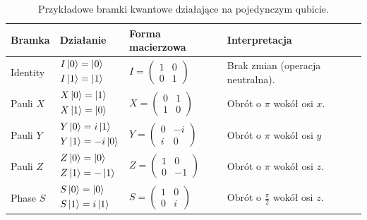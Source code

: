 \begin{table}[H]
\caption{Przykładowe bramki kwantowe działające na pojedynczym qubicie.}
\label{tab:bramki_kwantowe}
\resizebox{\textwidth}{!}
{
    \centering
    \begin{tabular}{l l l l}
        \hline
        \textbf{Bramka} & \textbf{Działanie} & \textbf{Forma macierzowa} & \textbf{Interpretacja} \\
        \hline
        Identity & $\begin{aligned} I\ket{0} &= \ket{0} \\ I\ket{1} &= \ket{1} \end{aligned}$ & $I = \begin{pmatrix} 1 & 0 \\ 0 & 1 \end{pmatrix}$ & Brak zmian (operacja neutralna). \\
        \hline
        Pauli $X$ & $\begin{aligned} X\ket{0} &= \ket{1} \\ X\ket{1} &= \ket{0} \end{aligned}$ & $X = \begin{pmatrix} 0 & 1 \\ 1 & 0 \end{pmatrix}$ & Obrót o $\pi$ wokół osi $x$. \\
        \hline
        Pauli $Y$ & $\begin{aligned} Y\ket{0} &= i\ket{1} \\ Y\ket{1} &= -i\ket{0} \end{aligned}$ & $Y = \begin{pmatrix} 0 & -i \\ i & 0 \end{pmatrix}$ & Obrót o $\pi$ wokół osi $y$ \\
        \hline
        Pauli $Z$ & $\begin{aligned} Z\ket{0} &= \ket{0} \\ Z\ket{1} &= -\ket{1} \end{aligned}$ & $Z = \begin{pmatrix} 1 & 0 \\ 0 & -1 \end{pmatrix}$ & Obrót o $\pi$ wokół osi $z$. \\
        \hline
        Phase $S$ & $\begin{aligned} S\ket{0} &= \ket{0} \\ S\ket{1} &= i\ket{1} \end{aligned}$ & $S = \begin{pmatrix} 1 & 0 \\ 0 & i \end{pmatrix}$ & Obrót o $\frac{\pi}{2}$ wokół osi $z$. \\

\end{tabular}}
\end{table}
